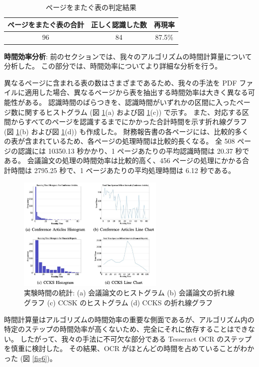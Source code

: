 \documentclass[uplatex, twocolumn,10pt]{jsarticle}
\begin{document}
\begin{table}[tp]
    \centering
    \caption{ページをまたぐ表の判定結果}
    \label{table3}
    \begin{tabular}{ccc}
        ページをまたぐ表の合計 & 正しく認識した数 & 再現率 \\
        \toprule
        96 & 84 & 87.5\% \\
    \end{tabular}
\end{table}

\textbf{時間効率分析}:
前のセクションでは、我々のアルゴリズムの時間計算量について分析した。
この部分では、時間効率についてより詳細な分析を行う。

異なるページに含まれる表の数はさまざまであるため、我々の手法を PDF ファイルに適用した場合、異なるページから表を抽出する時間効率は大きく異なる可能性がある。
認識時間のばらつきを、認識時間がいずれかの区間に入ったページ数に関するヒストグラム (図 \ref{fig5}(a) および図 \ref{fig5}(c)) で示す。
また、対応する区間からすべてのページを認識するまでにかかった合計時間を示す折れ線グラフ (図 \ref{fig5}(b) および図 \ref{fig5}(d)) も作成した。
財務報告書の各ページには、比較的多くの表が含まれているため、各ページの処理時間は比較的長くなる。
全 508 ページの認識には 10350.13 秒かかり、1 ページあたりの平均認識時間は 20.37 秒である。
会議論文の処理の時間効率は比較的高く、456 ページの処理にかかる合計時間は 2795.25 秒で、1 ページあたりの平均処理時間は 6.12 秒である。

\begin{figure}[tp]
    \begin{center}
        \includegraphics*[width=7cm]{image/master/master2/Fig5.png}
        \caption{実験時間の統計: (a) 会議論文のヒストグラム (b) 会議論文の折れ線グラフ (c) CCSK のヒストグラム (d) CCKS の折れ線グラフ}
        \label{fig5}
    \end{center}
\end{figure}

時間計算量はアルゴリズムの時間効率の重要な側面であるが、アルゴリズム内の特定のステップの時間効率が高くないため、完全にそれに依存することはできない。
したがって、我々の手法に不可欠な部分である Tesseract OCR のステップを慎重に検討した。
その結果、OCR がほとんどの時間を占めていることがわかった (図 \ref{fig6})。
\end{document}
